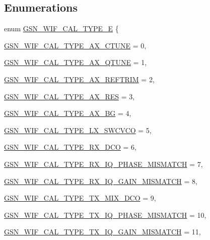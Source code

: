 \subsection*{Enumerations}
\begin{DoxyCompactItemize}
\item 
enum \hyperlink{a00607_a8806538ca7eb7172842f91d2d44d38f7}{GSN\_\-WIF\_\-CAL\_\-TYPE\_\-E} \{ \par
\hyperlink{a00607_a8806538ca7eb7172842f91d2d44d38f7a85c3615d088fb35493b90ded670d0206}{GSN\_\-WIF\_\-CAL\_\-TYPE\_\-AX\_\-CTUNE} =  0, 
\par
\hyperlink{a00607_a8806538ca7eb7172842f91d2d44d38f7a0f8f18d7b83b523b4c480f8257df0349}{GSN\_\-WIF\_\-CAL\_\-TYPE\_\-AX\_\-QTUNE} =  1, 
\par
\hyperlink{a00607_a8806538ca7eb7172842f91d2d44d38f7a92273d748b4c8d809e9f0454097d6f74}{GSN\_\-WIF\_\-CAL\_\-TYPE\_\-AX\_\-REFTRIM} =  2, 
\par
\hyperlink{a00607_a8806538ca7eb7172842f91d2d44d38f7a98940ee30babdb673342ca1b9159c740}{GSN\_\-WIF\_\-CAL\_\-TYPE\_\-AX\_\-RES} =  3, 
\par
\hyperlink{a00607_a8806538ca7eb7172842f91d2d44d38f7aa31797ceb963e27a3c4484100aa646fa}{GSN\_\-WIF\_\-CAL\_\-TYPE\_\-AX\_\-BG} =  4, 
\par
\hyperlink{a00607_a8806538ca7eb7172842f91d2d44d38f7adbf708e0b24b3097c826561c1360f592}{GSN\_\-WIF\_\-CAL\_\-TYPE\_\-LX\_\-SWCVCO} =  5, 
\par
\hyperlink{a00607_a8806538ca7eb7172842f91d2d44d38f7a5455d7261cba393c4c68aa025034c9dc}{GSN\_\-WIF\_\-CAL\_\-TYPE\_\-RX\_\-DCO} =  6, 
\par
\hyperlink{a00607_a8806538ca7eb7172842f91d2d44d38f7a3c2d540ff04a776c4a12af6a05aa111f}{GSN\_\-WIF\_\-CAL\_\-TYPE\_\-RX\_\-IQ\_\-PHASE\_\-MISMATCH} =  7, 
\par
\hyperlink{a00607_a8806538ca7eb7172842f91d2d44d38f7a53d3b8c8a818c35aa5a2547cea01469b}{GSN\_\-WIF\_\-CAL\_\-TYPE\_\-RX\_\-IQ\_\-GAIN\_\-MISMATCH} =  8, 
\par
\hyperlink{a00607_a8806538ca7eb7172842f91d2d44d38f7a5556d38db7226d604677fdfc2c4613b4}{GSN\_\-WIF\_\-CAL\_\-TYPE\_\-TX\_\-MIX\_\-DCO} =  9, 
\par
\hyperlink{a00607_a8806538ca7eb7172842f91d2d44d38f7a30a8b3fcdc8887bc0b65196049acdba4}{GSN\_\-WIF\_\-CAL\_\-TYPE\_\-TX\_\-IQ\_\-PHASE\_\-MISMATCH} =  10, 
\par
\hyperlink{a00607_a8806538ca7eb7172842f91d2d44d38f7a03f32476d563c6b2f50c3adeb69e4be5}{GSN\_\-WIF\_\-CAL\_\-TYPE\_\-TX\_\-IQ\_\-GAIN\_\-MISMATCH} =  11, 

\end{DoxyCompactItemize}

